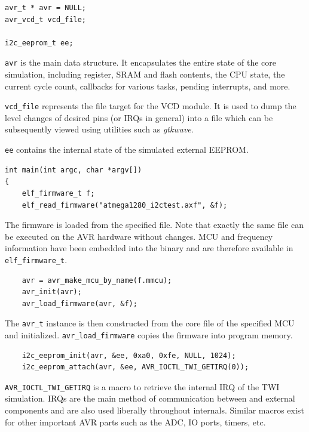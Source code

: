 \begin{lstlisting}
avr_t * avr = NULL;
avr_vcd_t vcd_file;

i2c_eeprom_t ee;
\end{lstlisting}

\lstinline|avr| is the main data structure. It encapsulates the entire state of the
core simulation, including register, \ac{SRAM} and flash contents, the \ac{CPU} state, the
current cycle count, callbacks for various tasks, pending interrupts, and more.

\lstinline|vcd_file| represents the file target for the \ac{VCD} module. It
is used to dump the level changes of desired pins (or \acp{IRQ} in general) into a
file which can be subsequently viewed using utilities such as \emph{gtkwave}.

\lstinline|ee| contains the internal state of the simulated external \ac{EEPROM}.

\begin{lstlisting}
int main(int argc, char *argv[])
{
    elf_firmware_t f;
    elf_read_firmware("atmega1280_i2ctest.axf", &f);
\end{lstlisting}

The firmware is loaded from the specified file. Note that exactly the same file
can be executed on the \ac{AVR} hardware without changes. \ac{MCU} and frequency
information have been embedded into the binary and are therefore available in
\lstinline|elf_firmware_t|.

\begin{lstlisting}
    avr = avr_make_mcu_by_name(f.mmcu);
    avr_init(avr);
    avr_load_firmware(avr, &f);
\end{lstlisting}

The \lstinline|avr_t| instance is then constructed from the core file of the
specified \ac{MCU} and initialized. \lstinline|avr_load_firmware| copies the
firmware into program memory.

\begin{lstlisting}
    i2c_eeprom_init(avr, &ee, 0xa0, 0xfe, NULL, 1024);
    i2c_eeprom_attach(avr, &ee, AVR_IOCTL_TWI_GETIRQ(0));
\end{lstlisting}

\lstinline|AVR_IOCTL_TWI_GETIRQ| is a macro to retrieve the internal \ac{IRQ} of the \ac{TWI}
simulation. \acp{IRQ} are the main method of communication between \simavr and
external components and are also used liberally throughout \simavr internals.
Similar macros exist for other important \ac{AVR} parts such as the \ac{ADC}, \ac{IO} ports,
timers, etc.


